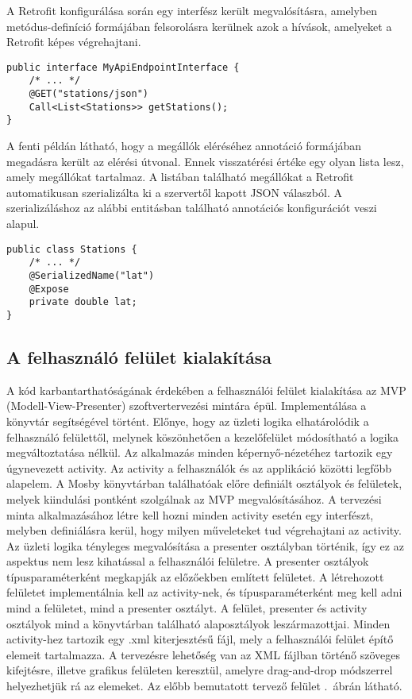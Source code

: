 A Retrofit konfigurálása során egy interfész került megvalósításra, amelyben metódus-definíció formájában felsorolásra kerülnek azok a hívások, amelyeket a Retrofit képes végrehajtani.
\begin{lstlisting}
public interface MyApiEndpointInterface {
	/* ... */
	@GET("stations/json")
    Call<List<Stations>> getStations();
}
\end{lstlisting}
A fenti példán látható, hogy a megállók eléréséhez annotáció formájában megadásra került az elérési útvonal.
Ennek visszatérési értéke egy olyan lista lesz, amely megállókat tartalmaz.
A listában található megállókat a Retrofit automatikusan szerializálta ki a szervertől kapott JSON válaszból.
A szerializáláshoz az alábbi entitásban található annotációs konfigurációt veszi alapul.
\begin{lstlisting}
public class Stations {
	/* ... */
	@SerializedName("lat")
	@Expose
	private double lat;
}
\end{lstlisting}

\subsection*{A felhasználó felület kialakítása}
\label{layout}
A kód karbantarthatóságának érdekében a felhasználói felület kialakítása az MVP (Modell-View-Presenter) szoftvertervezési mintára épül.
Implementálása a  könyvtár segítségével történt.
Előnye, hogy az üzleti logika elhatárolódik a felhasználó felülettől, melynek köszönhetően a kezelőfelület módosítható a logika megváltoztatása nélkül.
Az alkalmazás minden képernyő-nézetéhez tartozik egy úgynevezett activity.
Az activity a felhasználók és az applikáció közötti legfőbb alapelem.
A Mosby könyvtárban találhatóak előre definiált osztályok és felületek, melyek kiindulási pontként szolgálnak az MVP megvalósításához.
A tervezési minta alkalmazásához létre kell hozni minden activity esetén egy interfészt, melyben definiálásra kerül, hogy milyen műveleteket tud végrehajtani az activity.
Az üzleti logika tényleges megvalósítása a presenter osztályban történik, így ez az aspektus nem lesz kihatással a felhasználói felületre.
A presenter osztályok típusparaméterként megkapják az előzőekben említett felületet.
A létrehozott felületet implementálnia kell az activity-nek, és típusparaméterként meg kell adni mind a felületet, mind a presenter osztályt.
A felület, presenter és activity osztályok mind a könyvtárban található alaposztályok leszármazottjai.
Minden activity-hez tartozik egy .xml kiterjesztésű fájl, mely a felhasználói felület építő elemeit tartalmazza.
A tervezésre lehetőség van az XML fájlban történő szöveges kifejtésre, illetve grafikus felületen keresztül, amelyre drag-and-drop módszerrel helyezhetjük rá az elemeket.
Az előbb bemutatott tervező felület .\ ábrán látható.

